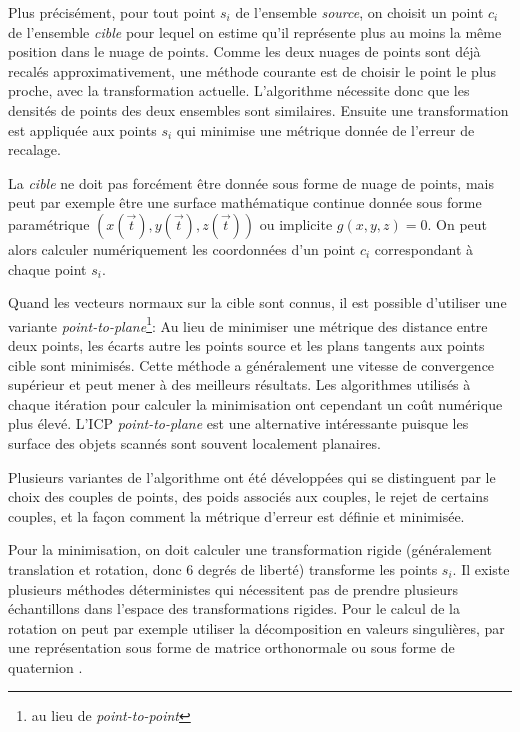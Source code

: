 \documentclass[a4paper,10pt]{scrreprt}
\begin{document}
Plus précisément, pour tout point $s_i$ de l'ensemble \emph{source}, on choisit un point $c_i$ de l'ensemble \emph{cible} pour lequel on estime qu'il représente plus au moins la même position dans le nuage de points. Comme les deux nuages de points sont déjà recalés approximativement, une méthode courante est de choisir le point le plus proche, avec la transformation actuelle. L'algorithme nécessite donc que les densités de points des deux ensembles sont similaires. Ensuite une transformation est appliquée aux points $s_i$ qui minimise une métrique donnée de l'erreur de recalage.

La \emph{cible} ne doit pas forcément être donnée sous forme de nuage de points, mais peut par exemple être une surface mathématique continue donnée sous forme paramétrique $(x(\vec{t}),y(\vec{t}),z(\vec{t}))$ ou implicite $g(x, y, z) = 0$. On peut alors calculer numériquement les coordonnées d'un point $c_i$ correspondant à chaque point $s_i$. \cite{Besl1992}

Quand les vecteurs normaux sur la cible sont connus, il est possible d'utiliser une variante \emph{point-to-plane}\footnote{au lieu de \emph{point-to-point}}: Au lieu de minimiser une métrique des distance entre deux points, les écarts autre les points source et les plans tangents aux points cible sont minimisés. Cette méthode a généralement une vitesse de convergence supérieur et peut mener à des meilleurs résultats. Les algorithmes utilisés à chaque itération pour calculer la minimisation ont cependant un coût numérique plus élevé. L'ICP \emph{point-to-plane} est une alternative intéressante puisque les surface des objets scannés sont souvent localement planaires. \cite{Low2004}

Plusieurs variantes de l'algorithme ont été développées qui se distinguent par le choix des couples de points, des poids associés aux couples, le rejet de certains couples, et la façon comment la métrique d'erreur est définie et minimisée. \cite{Rusi2001}

Pour la minimisation, on doit calculer une transformation rigide (généralement translation et rotation, donc 6 degrés de liberté) transforme les points $s_i$. Il existe plusieurs méthodes déterministes qui nécessitent pas de prendre plusieurs échantillons dans l'espace des transformations rigides. Pour le calcul de la rotation on peut par exemple utiliser la décomposition en valeurs singulières, par une représentation sous forme de matrice orthonormale ou sous forme de quaternion \cite{Horn1986}.
\end{document}
